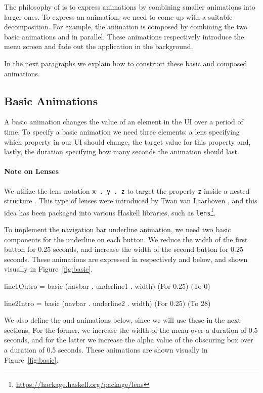 The philosophy of \dsl{} is to express animations by combining smaller animations into larger ones. To express an animation, we need to come up with a suitable decomposition. For example, the  animation is composed by combining the two basic animations  and  in parallel. These animations respectively introduce the menu screen and fade out the application in the background.

In the next paragraphs we explain how to construct these basic and composed animations.

\subsection{Basic Animations}

A basic animation changes the value of an element in the UI over a period of time. To specify a basic animation we need three elements: a lens specifying which property in our UI should change, the target value for this property and, lastly, the duration specifying how many seconds the animation should last.

\paragraph{Note on Lenses} We utilize the lens notation \texttt{x . y . z} to target the property \texttt{z} inside a nested structure . This type of lenses were introduced by Twan van Laarhoven \cite{vlLenses}, and this idea has been packaged into various Haskell libraries, such as \texttt{lens}\footnote{\url{https://hackage.haskell.org/package/lens}}.

To implement the navigation bar underline animation, we need two basic components for the underline on each button. We reduce the width of the first button for 0.25 seconds, and increase the width of the second button for 0.25 seconds. These animations are expressed in respectively  and  below, and shown visually in Figure~\ref{fig:basic}.

\begin{spec}
line1Outro = basic (navbar . underline1 . width) (For 0.25) (To 0)

line2Intro = basic (navbar . underline2 . width) (For 0.25) (To 28)
\end{spec}

We also define the  and  animations below, since we will use these in the next sections. For the former, we increase the width of the menu over a duration of 0.5 seconds, and for the latter we increase the alpha value of the obscuring box over a duration of 0.5 seconds. These animations are shown visually in Figure~\ref{fig:basic}.

